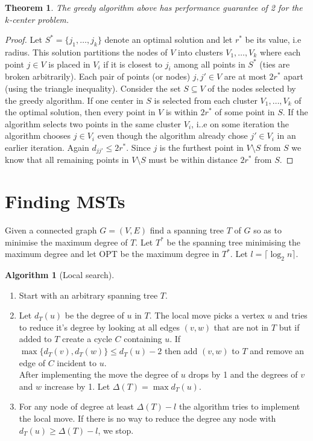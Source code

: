 \documentclass{article}
\newtheorem*{thm}{Theorem}
\theoremstyle{definition}
\newtheorem*{alg}{Algorithm}
\begin{document}
\begin{thm}
The greedy algorithm above has performance guarantee of 2 for the $k$-center problem.
\end{thm}
\begin{proof}
Let $S^*=\{j_1,\ldots,j_k\}$ denote an optimal solution and let $r^*$ be its value, i.e radius.
This solution partitions the nodes of $V$ into clusters $V_1,\ldots,V_k$ where each point $j\in V$ is placed in $V_i$ if it is closest to $j_i$ among all points in $S^*$ (ties are broken arbitrarily).
Each pair of points (or nodes) $j,j'\in V$ are at most $2r^*$ apart (using the triangle inequality).
Consider the set $S\subseteq V$ of the nodes selected by the greedy algorithm.
If one center in $S$ is selected from each cluster $V_1,\ldots,V_k$ of the optimal solution, then every point in $V$ is within $2r^*$ of some point in $S$.
If the algorithm selects two points in the same cluster $V_i$, i..e on some iteration the algorithm chooses $j\in V_i$ even though the algorithm already chose $j'\in V_i$ in an earlier iteration.
Again $d_{jj'}\le 2r^*$.
Since $j$ is the furthest point in $V\setminus S$ from $S$ we know that all remaining points in $V\setminus S$ must be within distance $2r^*$ from $S$.
\end{proof}


\section{Finding MSTs}
Given a connected graph $G=(V,E)$ find a spanning tree $T$ of $G$ so as to minimise the maximum degree of $T$.
Let $T^*$ be the spanning tree minimising the maximum degree and let OPT be the maximum degree in $T^*$.
Let $l =\lceil \log_2n\rceil$.

\begin{alg}[Local search]~\\
\begin{enumerate}
\item Start with an arbitrary spanning tree $T$.
\item Let $d_T(u)$ be the degree of $u$ in $T$.
The local move picks a vertex $u$ and tries to reduce it's degree by looking at all edges $(v,w)$ that are not in $T$ but if added to $T$ create a cycle $C$ containing $u$.
If $\max\{d_T(v),d_T(w)\} \le d_T(u)-2$ then add $(v,w)$ to $T$ and remove an edge of $C$ incident to $u$. \\
After implementing the move the degree of $u$ drops by 1 and the degrees of $v$ and $w$ increase by 1.
Let $\Delta(T) = \max d_T(u)$.
\item For any node of degree at least $\Delta(T) - l $ the algorithm tries to implement the local move.
If there is no way to reduce the degree any node with $d_T(u)\ge \Delta(T) - l$, we stop.
\end{enumerate}
\end{alg}
\end{document}
